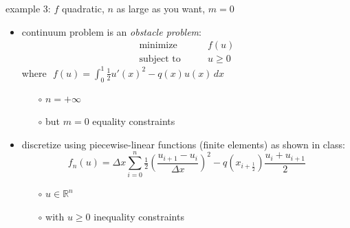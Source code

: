 \documentclass[10pt,hyperref]{beamer}
\newcommand{\RR}{\mathbb{R}}
\newcommand{\ds}{\displaystyle}
\begin{document}
\begin{frame}{example 3: $f$ quadratic, $n$ as large as you want, $m=0$}

\begin{itemize}
\item continuum problem is an \emph{obstacle problem}:
\begin{equation*}
\begin{matrix}
\text{minimize} \qquad & f(u) \\
\text{subject to} \qquad & u \ge 0
\end{matrix}
\end{equation*}
where \,\,$\ds f(u) = \int_0^1 \tfrac{1}{2} u'(x)^2 - q(x) u(x)\,dx$

    \begin{itemize}
    \item[$\circ$] $n=+\infty$
    \item[$\circ$] but $m=0$ equality constraints
    \end{itemize}
\item discretize using piecewise-linear functions (finite elements) as shown in class:
\begin{equation*}
    f_n(u) = \Delta x \sum_{i=0}^n \tfrac{1}{2}\left(\frac{u_{i+1}-u_i}{\Delta x}\right)^2 - q(x_{i+\frac{1}{2}}) \frac{u_i + u_{i+1}}{2}
\end{equation*}

    \begin{itemize}
    \item[$\circ$] $u\in\RR^n$
    \item[$\circ$] with $u\ge 0$ inequality constraints
    \end{itemize}
\end{itemize}
\end{frame}
\end{document}
